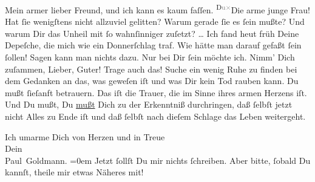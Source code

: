 \pstart{}Mein armer lieber Freund,\pend\vspace{0.5em}
\pstart
           \label{K_L02870-1v}\label{K_L02870-1} und ich kann es kaum faſſen. \substVorne{}\textsuperscript{D\textcolor{gray}{u}\textcolor{gray}{×}}\substDazwischen{}Die\substHinten{} arme junge Frau! Hat{ }ſie wenigſtens nicht allzuviel gelitten? Warum gerade{ }ſie es{ }ſein mußte? Und warum
               Dir das Unheil mit{ }ſo wahnſinniger \label{K_L02870-2v}\label{K_L02870-2} zuſetzt? {\dots} Ich fand heut{ }früh Deine Depeſche, die mich wie ein Donnerſchlag traf. Wie hätte man
               darauf gefaßt{ }ſein{ }ſollen! Sagen kann man nichts dazu. Nur bei Dir{ }ſein möchte ich.
               Nimm’ Dich zuſammen, Lieber, Guter! Trage auch das! Suche ein wenig Ruhe zu finden
               bei dem Gedanken an das, was geweſen iſt und was Dir kein Tod rauben kann. {\pb}Du mußt ſieſanft betrauern. Das iſt die Trauer, die im Sinne ihres
               armen Herzens iſt. Und Du mußt, Du \uline{mußt} Dich zu der
               Erkenntniß durchringen, daß{ }ſelbſt jetzt nicht Alles zu Ende iſt und daß{ }ſelbſt nach
               dieſem Schlage das Leben weitergeht.\pend
           
\pstart
           Ich umarme Dich von Herzen und in Treue {\\[\baselineskip]}Dein {\\[\baselineskip]}\spacefill\mbox{Paul Goldmann.}\pend
           \leftskip=0em{}
\pstart
           \noindent{}Jetzt{ }ſollſt Du mir nichts{ }ſchreiben. Aber bitte,{ }ſobald Du kannſt, theile mir
                  etwas Näheres mit!\pend
           

